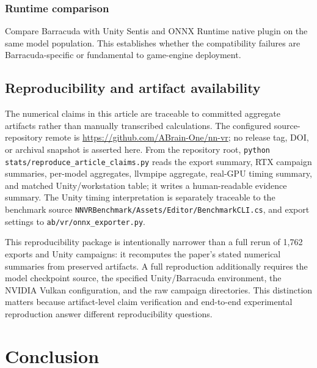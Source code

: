 \documentclass[10pt,twocolumn]{article}
\begin{document}
\subsubsection{Runtime comparison}

Compare Barracuda with Unity Sentis and ONNX Runtime native plugin on the same model population. This establishes whether the compatibility failures are Barracuda-specific or fundamental to game-engine deployment.

\subsection{Reproducibility and artifact availability}\label{sec:artifacts}

The numerical claims in this article are traceable to committed aggregate artifacts rather than manually transcribed calculations. The configured source-repository remote is \url{https://github.com/ABrain-One/nn-vr}; no release tag, DOI, or archival snapshot is asserted here. From the repository root, \texttt{python stats/reproduce\_article\_claims.py} reads the export summary, RTX campaign summaries, per-model aggregates, llvmpipe aggregate, real-GPU timing summary, and matched Unity/workstation table; it writes a human-readable evidence summary. The Unity timing interpretation is separately traceable to the benchmark source \texttt{NNVRBenchmark/Assets/Editor/BenchmarkCLI.cs}, and export settings to \texttt{ab/vr/onnx\_exporter.py}.

This reproducibility package is intentionally narrower than a full rerun of 1,762 exports and Unity campaigns: it recomputes the paper's stated numerical summaries from preserved artifacts. A full reproduction additionally requires the model checkpoint source, the specified Unity/Barracuda environment, the NVIDIA Vulkan configuration, and the raw campaign directories. This distinction matters because artifact-level claim verification and end-to-end experimental reproduction answer different reproducibility questions.

\section{Conclusion}\label{sec:conclusion}
\end{document}
